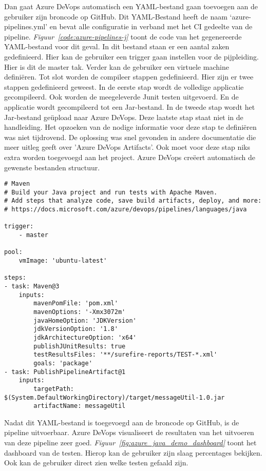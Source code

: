 Dan gaat Azure DeVops automatisch een YAML-bestand gaan toevoegen aan de gebruiker zijn broncode op GitHub. Dit YAML-Bestand heeft de naam ‘azure-pipelines.yml’ en bevat alle configuratie in verband met het CI gedeelte van de pipeline. \emph{Figuur~\ref{code:azure-pipelines-j}} toont de code van het gegenereerde YAML-bestand voor dit geval. In dit bestand staan er een aantal zaken gedefinieerd. Hier kan de gebruiker een trigger gaan instellen voor de pijpleiding. Hier is dit de master tak. Verder kan de gebruiker een virtuele machine definiëren. Tot slot worden de compileer stappen gedefinieerd. Hier zijn er twee stappen gedefinieerd geweest. In de eerste stap wordt de volledige applicatie gecompileerd. Ook worden de meegeleverde Junit testen uitgevoerd. En de applicatie wordt gecompileerd tot een Jar-bestand. In de tweede stap wordt het Jar-bestand geüpload naar Azure DeVops. Deze laatste stap staat niet in de handleiding. Het opzoeken van de nodige informatie voor deze stap te definiëren was niet tijdrovend. De oplossing was snel gevonden in andere documentatie die meer uitleg geeft over 'Azure DeVops Artifacts'. Ook moet voor deze stap niks extra worden toegevoegd aan het project. Azure DeVops creëert automatisch de gewenste bestanden structuur.

\begin{lstlisting}
# Maven
# Build your Java project and run tests with Apache Maven.
# Add steps that analyze code, save build artifacts, deploy, and more:
# https://docs.microsoft.com/azure/devops/pipelines/languages/java

trigger:
    - master

pool:
    vmImage: 'ubuntu-latest'

steps:
- task: Maven@3
    inputs:
        mavenPomFile: 'pom.xml'
        mavenOptions: '-Xmx3072m'
        javaHomeOption: 'JDKVersion'
        jdkVersionOption: '1.8'
        jdkArchitectureOption: 'x64'
        publishJUnitResults: true
        testResultsFiles: '**/surefire-reports/TEST-*.xml'
        goals: 'package'
- task: PublishPipelineArtifact@1
    inputs:
        targetPath: $(System.DefaultWorkingDirectory)/target/messageUtil-1.0.jar
        artifactName: messageUtil
\end{lstlisting}

Nadat dit YAML-bestand is toegevoegd aan de broncode op GitHub, is de pipeline uitvoerbaar. Azure DeVops visualiseert de resultaten van het uitvoeren van deze pipeline zeer goed. \emph{Figuur~\ref{fig:azure_java_demo_dashboard}} toont het dashboard van de testen. Hierop kan de gebruiker zijn slaag percentages bekijken. Ook kan de gebruiker direct zien welke testen gefaald zijn.

